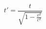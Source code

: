 \documentclass{article}
\begin{document}
	
	
	\[
	t' = \frac{t}{\sqrt{1 - \frac{v^2}{c^2}}}
	\]
	
	
\end{document}
